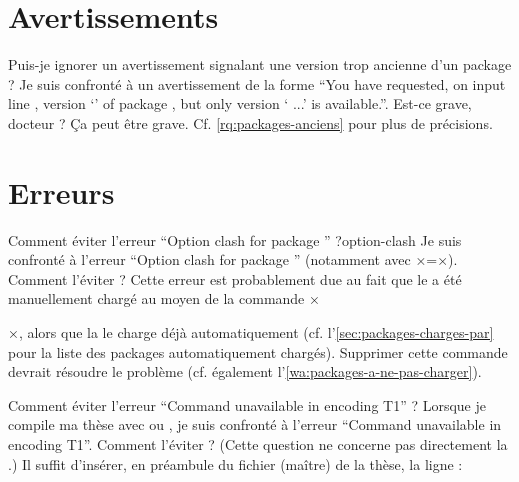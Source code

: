 \section{Avertissements}
\label{sec:avertissements}

\begin{dbfaq}{Puis-je ignorer un avertissement signalant une version trop
    ancienne d'un package ?}{}
  Je suis confronté à un avertissement de la forme \enquote{You have requested,
    on input line , version `' of package
    , but only version ` ...'
    is available.}. Est-ce grave, docteur ?
  \tcblower
  Ça peut être grave. Cf. \vref{rq:packages-anciens} pour plus de précisions.
\end{dbfaq}

\section{Erreurs}
\label{sec:erreurs}

\begin{dbfaq}{Comment éviter l'erreur \enquote{Option clash for package
      } ?}{option-clash}
  Je suis confronté à l'erreur \enquote{Option clash for package
    } (notamment avec ×=×). Comment
  l'éviter ?
  \tcblower
  Cette erreur est probablement due au fait que le  a été
  manuellement chargé au moyen de la commande
  ×\usepackage[...]{×\meta{package}×}×, alors que la \yatcl{} le charge déjà
  automatiquement (cf. l'\vref{sec:packages-charges-par} pour la liste des
  packages automatiquement chargés). Supprimer cette commande devrait résoudre
  le problème (cf. également l'\vref{wa:packages-a-ne-pas-charger}).
\end{dbfaq}

\begin{dbfaq}{Comment éviter l'erreur \enquote{Command
      \protect{} unavailable in encoding T1} ?}{}
  Lorsque je compile ma thèse avec  ou , je
  suis confronté à l'erreur \enquote{Command
     unavailable in encoding T1}. Comment
  l'éviter ?
  \tcblower
  (Cette question ne concerne pas directement la \yatcl{}.) Il suffit d'insérer,
  en préambule du fichier (maître) de la thèse, la
  ligne :
\begin{preamblecode}[title=Par exemple dans le \File{\configurationfile}]
\end{preamblecode}
\end{dbfaq}


